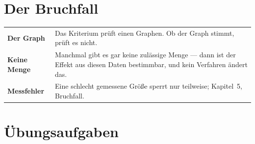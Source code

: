 \section{Der Bruchfall}

\begin{warnung}
\begin{center}
{\small
\renewcommand{\arraystretch}{1.52}
\begin{tabular}{@{}P{2.6cm}P{6.0cm}@{}}
\toprule
\textbf{Der Graph} & Das Kriterium prüft einen Graphen. Ob der Graph stimmt, prüft es nicht.\\
\textbf{Keine Menge} & Manchmal gibt es gar keine zulässige Menge --- dann ist der Effekt aus diesen Daten  bestimmbar, und kein Verfahren ändert das.\\
\textbf{Messfehler} & Eine schlecht gemessene Größe sperrt nur teilweise; Kapitel~5, Bruchfall.\\
\bottomrule
\end{tabular}}
\end{center}

\begin{center}
\begin{minipage}{0.88\textwidth}
\end{minipage}
\end{center}
\end{warnung}

\section{Übungsaufgaben}

